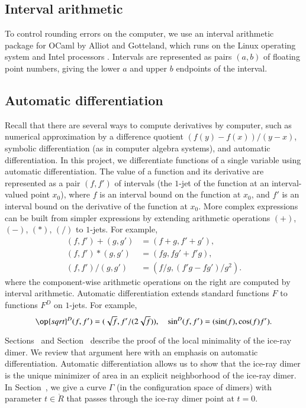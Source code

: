 \subsection{Interval arithmetic}

To control rounding errors on the computer, we use an interval
arithmetic package for OCaml by Alliot and Gotteland, which runs on
the Linux operating system and Intel processors \cite{All}.  Intervals
are represented as pairs $(a,b)$ of floating point numbers, giving the
lower $a$ and upper $b$ endpoints of the interval.


\subsection{Automatic differentiation}

Recall that there are several ways to compute derivatives by computer,
such as numerical approximation by a difference quotient
$(f(y)-f(x))/(y-x)$, symbolic differentiation (as in computer algebra
systems), and automatic differentiation.  In this project, we
differentiate functions of a single variable using automatic
differentiation.  The value of a function and its derivative are
represented as a pair $(f,f')$ of intervals (the $1$-jet of the
function at an interval-valued point $x_0$), where $f$ is an interval
bound on the function at $x_0$, and $f'$ is an interval bound on the
derivative of the function at $x_0$.  More complex expressions can be
built from simpler expressions by extending arithmetic operations
$(+)$, $(-)$, $(*)$, $(/)$ to $1$-jets.  For example,
\begin{align*}
(f,f') + (g,g') &= (f+g,f'+g'),\\
(f,f') * (g,g') &= (f g,f g' + f' g),\\
(f,f') / (g,g') &= (f / g, (f' g - f g')/g^2).
\end{align*}
where the component-wise arithmetic operations on the right are
computed by interval arithmetic.  Automatic differentiation extends
standard functions $F$ to functions $F^D$ on $1$-jets.
For example,
\[
\op{sqrt}^D(f,f') = (\sqrt{f}, f'/(2\sqrt{f})),\quad 
\sin^D (f,f') = (\sin(f), \cos(f) f').
\]

Sections~ and Section~ describe
the proof of the local minimality of the ice-ray dimer.  We review
that argument here with an emphasis on automatic differentiation.
Automatic differentiation allows us to show that the ice-ray dimer is
the unique minimizer of area in an explicit neighborhood of the
ice-ray dimer.  In Section~, we give a curve
$\Gamma$ (in the configuration space of dimers) with parameter
$t\in\ring{R}$ that passes through the ice-ray dimer point at $t=0$.

